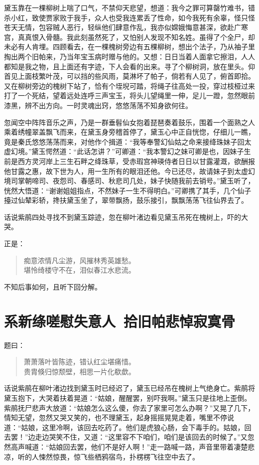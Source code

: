 \documentclass[12pt,oneside]{book}
\newenvironment{shici}{%
\begin{verse}%
\centering\large\hspace{12pt}}%
{\end{verse}}
\begin{document}
黛玉靠在一棵柳树上喘了口气，不禁仰天悲望，想道：我今之罪可算罄竹难书，错杀小红，致使贾家败于我手，众人也受我连累丢了性命，如今我死有余辜，怪只怪苍天无情，包容贼人恶行，轻纵他们肆意作乱，我亦似嫦娥悔意甚深，欲赴广寒宫，真真恨入骨髓。我此刻虽然死了，又怕别人发现不知名姓。虽得了个全尸，却未必有人肯埋。四顾看去，在一棵槐树旁边有五棵柳树，想出个法子，乃从袖子里掏出两个旧帕来，乃当年宝玉病时赠与他的。又想：日日当着人面拿它擦泪，人人都知是我之物，且上面还有字迹，下人会看的出来。寻了个柳树洞，放在里头。仰首见上面枝繁叶茂，可以挡的些风雨，莫淋坏了帕子，倘若有人见了，俯首即拾。又在柳树旁边的槐树下站了，恰有个垤堄可踏，将绳子往高处一投，穿过枝桠过来打了一个死结，望着远处连呼三声宝玉，将头儿望绳里一伸，足儿一蹬，忽然眼前漆黑，辨不出方向。一时灵魂出窍，悠悠荡荡不知身欲何往。

忽闻空中阵阵音乐之声，乃是一群垂髫仙女抱着琵琶奏着鼓乐，围着一个面熟之人乘着绣幢翠盖飘飞而来，在黛玉身旁稽首停了，黛玉心中正自恍惚，仔细儿一瞧，竟是秦氏悠悠荡荡而来，对他作个揖道：“我等奉警幻仙姑之命来接绛珠妹子回太虚幻境。”黛玉愕然道：“此话怎讲？”可卿道：“我本警幻之妹可卿是也，因妹子生前是西方灵河岸上三生石畔之绛珠草，受赤瑕宫神瑛侍者日日以甘露灌溉，欲酬报他甘露之惠，故下世为人，用一生所有的眼泪还他。今已还尽，故请妹子到太虚幻境司掌朝啼司、夜怨司、春感司、秋悲司几处，妹子快随我前去销号。”黛玉听了，恍然大悟道：“谢谢姐姐指点，不然妹子一生不得明白。”可卿携了其手，几个仙子擡过仙辇彩轿，搀扶黛玉坐了，翠带飘扬，鼓乐接引，飘飘荡荡飞往仙界去了。

话说紫鹃四处寻找不到黛玉踪迹，忽在柳叶渚边看见黛玉吊死在槐树上，吓的大哭。

正是：

\begin{shici}
痴意浓情凡尘游，风摧林秀英雄愁。\\
堪怜绮楼守不在，泪似春江水悲流。
\end{shici}

不知后事如何，且听下回分解。 



\chapter{系新绦嗟慰失意人~拾旧帕悲悼寂寞骨}
题曰：

\begin{shici}
萧萧落叶皆陈迹，错认红尘堪痛惜。\\
贵胄倏归惊颓壁，相思一片化欷歔。
\end{shici}

话说紫鹃在柳叶渚边找到黛玉时已经迟了，黛玉已经吊在槐树上气绝身亡。紫鹃将黛玉抱下，大哭着扶着晃道：“姑娘，醒醒罢，别吓我啊。”黛玉只是往地上歪倒。紫鹃抚尸悲声大放道：“姑娘怎么这么傻，你去了家里可怎么办啊？”又晃了几下，情知无望，忽然又哭又笑的，也不理黛玉，起身摇摇晃晃走着，嘴里不停说道：“姑娘，这里冷啊，该回去吃药了。他们是虎狼心肠，会下毒手的。姑娘，回去罢！”边走边哭笑不住，又道：“这里容不下咱们，咱们是该回去的时候了。”又忽然高声喊道：“姑娘回去罢，他们不是好人啊！”走一路喊一路，声音里带着凄楚悲凉，听的人悚然惊畏，惊飞些栖鸦宿鸟，扑楞楞飞往空中去了。
\end{document}

